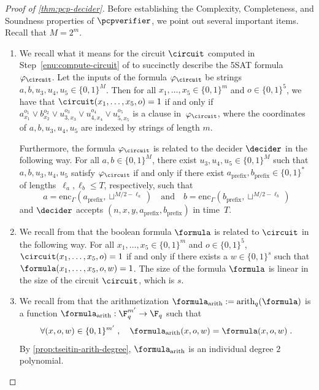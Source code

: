 \begin{proof}[Proof of \cref{thm:pcp-decider}]
Before establishing the Complexity, Completeness, and Soundness properties of
$\pcpverifier$, we point out several important items.
Recall that $M = 2^m$.
\begin{enumerate}
\item We recall what it means for the circuit $\circuit$ computed in
  Step~\ref{enu:compute-circuit} of  to succinctly
  describe the 5SAT formula $\varphi_\circuit$.
  Let the inputs of the formula $\varphi_\circuit$ be strings $a,b,u_3,u_4,u_5
  \in \{0,1\}^M$.
  Then for all $x_1,\ldots,x_5 \in \{0,1\}^m$ and $o \in \{0,1\}^5$, we have
  that $\circuit(x_1,\ldots,x_5,o) = 1$ if and only if $a_{x_1}^{o_1} \lor
  b_{x_2}^{o_2} \lor u_{3, x_3}^{o_3} \lor u_{4, x_4}^{o_4} \lor u_{5,
    x_5}^{o_5}$ is a clause in~$\varphi_\circuit$, where the coordinates of
  $a,b,u_3,u_4,u_5$ are indexed by strings of length $m$.

  Furthermore, the formula $\varphi_\circuit$ is related to the decider
  $\decider$ in the following way.
  For all $a, b\in \{0, 1\}^M$, there exist $u_3, u_4, u_5 \in \{0, 1\}^M$ such
  that $a, b, u_3, u_4, u_5$ satisfy $\varphi_{\circuit}$ if and only if there
  exist $a_{\mathrm{prefix}}, b_{\mathrm{prefix}} \in \{0, 1\}^*$ of
  lengths~$\ell_a, \ell_b \leq T$, respectively, such that
  \begin{equation*}
    a = \mathrm{enc}_\Gamma(a_{\mathrm{prefix}}, \sqcup^{M/2 - \ell_a})
    \quad \text{and} \quad
    b = \mathrm{enc}_\Gamma(b_{\mathrm{prefix}}, \sqcup^{M/2 - \ell_b})
  \end{equation*}
  and $\decider$ accepts $(n, x, y, a_{\mathrm{prefix}}, b_{\mathrm{prefix}})$
  in time~$T$.
  
\item We recall from  that the boolean formula $\formula$ is related to $\circuit$ in the following
  way.
  For all $x_1, \ldots,x_5 \in \{0, 1\}^m$ and $o \in \{0, 1\}^5$,
  $\circuit(x_1,\ldots,x_5, o) = 1$ if and only if there exists a $w \in \{0,
  1\}^s$ such that $\formula(x_1,\ldots,x_5, o, w) = 1$.
  The size of the formula $\formula$ is linear in the size of the circuit
  $\circuit$, which is $s$.
  
\item We recall from  that the arithmetization $\formula_{\mathrm{arith}}:=
  \mathrm{arith}_q(\formula)$ is a function
  $\formula_{\mathrm{arith}}:\F_q^{m'}\rightarrow \F_q$ such that
  \begin{equation}
    \label{eq:farith}
    \forall (x,o,w) \in \{0, 1\}^{m'}\;,
    \quad \formula_{\mathrm{arith}}(x,o,w) = \formula(x,o,w)\;.
  \end{equation}
  By \cref{prop:tseitin-arith-degree}, $\formula_{\mathrm{arith}}$ is an
  individual degree $2$ polynomial.
\end{enumerate}


\end{proof}
